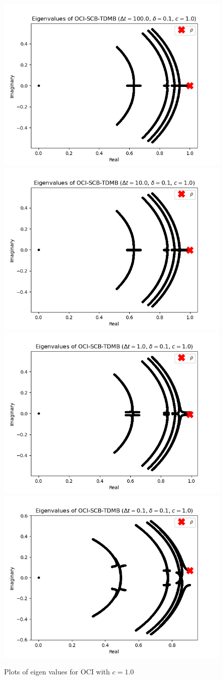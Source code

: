 \begin{figure}
    \includegraphics[width=.24\textwidth]{appendix/eig_plots/c1/mfp0.1dt100.0c1.0.png}
    \includegraphics[width=.24\textwidth]{appendix/eig_plots/c1/mfp0.1dt10.0c1.0.png}
    \includegraphics[width=.24\textwidth]{appendix/eig_plots/c1/mfp0.1dt1.0c1.0.png}
    \includegraphics[width=.24\textwidth]{appendix/eig_plots/c1/mfp0.1dt0.1c1.0.png}
    
    \caption{Plots of eigen values for OCI with $c=1.0$}
    \label{appendix:1}
\end{figure}


